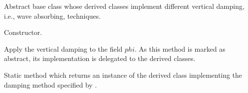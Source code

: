 \documentclass[letterpaper,10pt,english]{sphinxmanual}
\begin{document}
\begin{fulllineitems}
\label{\detokenize{api:dycore.vertical_damping.VerticalDamping}}
Abstract base class whose derived classes implement different vertical damping, i.e., wave absorbing, techniques.

\begin{fulllineitems}
\label{\detokenize{api:dycore.vertical_damping.VerticalDamping.__init__}}
Constructor.

\end{fulllineitems}


\begin{fulllineitems}
\label{\detokenize{api:dycore.vertical_damping.VerticalDamping.apply}}
Apply the vertical damping to the field \(phi\). As this method is marked as abstract,
its implementation is delegated to the derived classes.

\end{fulllineitems}


\begin{fulllineitems}
\label{\detokenize{api:dycore.vertical_damping.VerticalDamping.factory}}
Static method which returns an instance of the derived class implementing the damping method
specified by .

\end{fulllineitems}


\end{fulllineitems}

\end{document}
